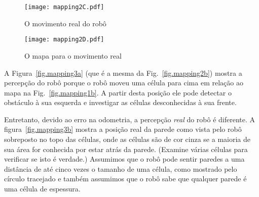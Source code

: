 \begin{figure}
\begin{minipage}{.45\textwidth}
\texttt{[image: mapping2C.pdf]}
\caption{O movimento real do robô}
\label{fig.mapping2c}
\end{minipage}
\hspace{\fill}
\begin{minipage}{.45\textwidth}
\texttt{[image: mapping2D.pdf]}
\caption{O mapa para o movimento real}
\label{fig.mapping2d}
\end{minipage}
\end{figure}
%
%
%
A Figura~\ref{fig.mapping3a} (que é a mesma da Fig.~\ref{fig.mapping2b}) mostra a percepção do robô porque o robô moveu uma célula para cima em relação ao mapa na Fig.~\ref{fig.mapping1b}. A partir desta posição ele pode detectar o obstáculo à sua esquerda e investigar as células desconhecidas à sua frente.

Entretanto, devido ao erro na odometria, a percepção \emph{real} do robô é diferente. A figura~\ref{fig.mapping3b} mostra a posição real da parede como vista pelo robô sobreposto no topo das células, onde as células são de cor cinza se a maioria de sua área for conhecida por estar atrás da parede. (Examine várias células para verificar se isto é verdade.) Assumimos que o robô pode sentir paredes a uma distância de até cinco vezes o tamanho de uma célula, como mostrado pelo círculo tracejado e também assumimos que o robô sabe que qualquer parede é uma célula de espessura.

